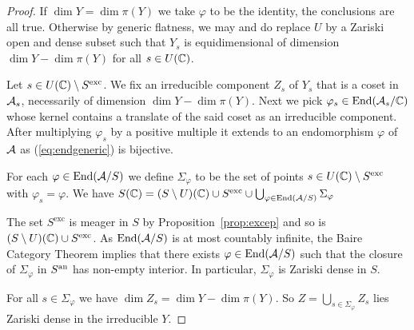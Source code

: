 \documentclass[12pt,oneside]{amsart}
\begin{document}
\begin{proof}
  If $\dim Y = \dim\pi(Y)$ we take $\varphi$ to be the identity, the
  conclusions are all true. 
  Otherwise by generic flatness, we may and do replace $U$ by a  Zariski open and dense
  subset such that
  $Y_s$ is equidimensional of dimension $\dim Y-\dim\pi(Y)$ for all
  $s\in U({\mathbb{C}})$. %
  
  

  
  Let $s\in U({\mathbb{C}})\setminus S^{\mathrm{exc}}$.
  We fix an irreducible component $Z_s$ of $Y_s$
  that is a coset in $\mathcal{A}_s$, necessarily of dimension $\dim Y
  -\dim\pi(Y)$. Next we pick
  $\varphi_s \in \mathrm{End}({\mathcal{A}_s}/{\mathbb{C}})$ whose kernel contains
  a translate of the said coset as an irreducible component.
  After multiplying $\varphi_s$ by a
  positive multiple it extends to  an
  endomorphism $\varphi$ of $\mathcal{A}$ as (\ref{eq:endgeneric}) is
  bijective.
 
  For each $\varphi\in\mathrm{End}(\mathcal{A}/S)$ we define
  $\Sigma_{\varphi}$ to be the set of points $s\in U({\mathbb{C}})\setminus
  S^{\mathrm{exc}}$ with $\varphi_s=\varphi$.
  We have
  $S({\mathbb{C}}) = (S\setminus U)({\mathbb{C}})\cup
  S^{\mathrm{exc}} \cup \bigcup_{\varphi\in \mathrm{End}(\mathcal{A}/S)} \Sigma_{\varphi}$
  
  The set $  S^{\mathrm{exc}}$ is meager in $S$
  by Proposition~\ref{prop:excep} and so is $ (S\setminus U)({\mathbb{C}})\cup
    S^{\mathrm{exc}}$.
  As  $\mathrm{End}(\mathcal{A}/S)$ is at most countably infinite,   
  the Baire Category Theorem implies that there exists
  $\varphi\in\mathrm{End}(\mathcal{A}/S)$ such that the closure of 
  $\Sigma_{\varphi}$ in ${S}^{\mathrm{an}}$ has non-empty interior.
  In particular, $\Sigma_\varphi$ is Zariski dense in $S$. 

  For all $s\in \Sigma_{\varphi}$ we have $\dim Z_s = \dim Y-\dim\pi(Y)$.
  So $Z = \bigcup_{s\in \Sigma_{\varphi}} Z_s$ lies
  Zariski dense in the irreducible $Y$. 


\end{proof}
\end{document}
